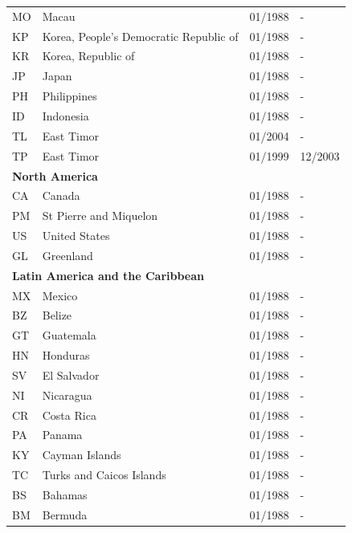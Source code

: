 \begin{scriptsize}
\begin{longtable}{lp{8.8cm}p{2cm}p{2cm}}
	MO & Macau                                  & 01/1988 & -  \\
	KP & Korea, People's Democratic Republic of & 01/1988 & -  \\
	KR & Korea, Republic of                     & 01/1988 & -  \\
	JP & Japan                                  & 01/1988 & -  \\
	PH & Philippines                            & 01/1988 & -  \\
	ID & Indonesia                              & 01/1988 & -  \\
	TL & East Timor                             & 01/2004 & -  \\
	TP & East Timor                             & 01/1999 & 12/2003  \\
	\midrule
	\multicolumn{3}{l}{\textbf{North America}}  &  \\
	CA & Canada                 & 01/1988 & -  \\
	PM & St Pierre and Miquelon & 01/1988 & -  \\
	US & United States          & 01/1988 & -  \\
	GL & Greenland              & 01/1988 & -  \\
	\midrule
	\multicolumn{3}{l}{\textbf{Latin America and the Caribbean}}  &  \\
	MX & Mexico                                   & 01/1988 & -  \\
	BZ & Belize                                   & 01/1988 & -  \\
	GT & Guatemala                                & 01/1988 & -  \\
	HN & Honduras                                 & 01/1988 & -  \\
	SV & El Salvador                              & 01/1988 & -  \\
	NI & Nicaragua                                & 01/1988 & -  \\
	CR & Costa Rica                               & 01/1988 & -  \\
	PA & Panama                                   & 01/1988 & -  \\
	KY & Cayman Islands                           & 01/1988 & -  \\
	TC & Turks and Caicos Islands                 & 01/1988 & -  \\
	BS & Bahamas                                  & 01/1988 & -  \\
	BM & Bermuda                                  & 01/1988 & -  \\

\end{longtable}
\end{scriptsize}
